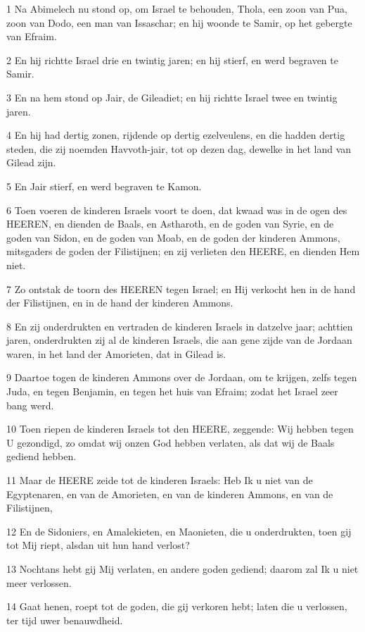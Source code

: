 \par 1 Na Abimelech nu stond op, om Israel te behouden, Thola, een zoon van Pua, zoon van Dodo, een man van Issaschar; en hij woonde te Samir, op het gebergte van Efraim.
\par 2 En hij richtte Israel drie en twintig jaren; en hij stierf, en werd begraven te Samir.
\par 3 En na hem stond op Jair, de Gileadiet; en hij richtte Israel twee en twintig jaren.
\par 4 En hij had dertig zonen, rijdende op dertig ezelveulens, en die hadden dertig steden, die zij noemden Havvoth-jair, tot op dezen dag, dewelke in het land van Gilead zijn.
\par 5 En Jair stierf, en werd begraven te Kamon.
\par 6 Toen voeren de kinderen Israels voort te doen, dat kwaad was in de ogen des HEEREN, en dienden de Baals, en Astharoth, en de goden van Syrie, en de goden van Sidon, en de goden van Moab, en de goden der kinderen Ammons, mitsgaders de goden der Filistijnen; en zij verlieten den HEERE, en dienden Hem niet.
\par 7 Zo ontstak de toorn des HEEREN tegen Israel; en Hij verkocht hen in de hand der Filistijnen, en in de hand der kinderen Ammons.
\par 8 En zij onderdrukten en vertraden de kinderen Israels in datzelve jaar; achttien jaren, onderdrukten zij al de kinderen Israels, die aan gene zijde van de Jordaan waren, in het land der Amorieten, dat in Gilead is.
\par 9 Daartoe togen de kinderen Ammons over de Jordaan, om te krijgen, zelfs tegen Juda, en tegen Benjamin, en tegen het huis van Efraim; zodat het Israel zeer bang werd.
\par 10 Toen riepen de kinderen Israels tot den HEERE, zeggende: Wij hebben tegen U gezondigd, zo omdat wij onzen God hebben verlaten, als dat wij de Baals gediend hebben.
\par 11 Maar de HEERE zeide tot de kinderen Israels: Heb Ik u niet van de Egyptenaren, en van de Amorieten, en van de kinderen Ammons, en van de Filistijnen,
\par 12 En de Sidoniers, en Amalekieten, en Maonieten, die u onderdrukten, toen gij tot Mij riept, alsdan uit hun hand verlost?
\par 13 Nochtans hebt gij Mij verlaten, en andere goden gediend; daarom zal Ik u niet meer verlossen.
\par 14 Gaat henen, roept tot de goden, die gij verkoren hebt; laten die u verlossen, ter tijd uwer benauwdheid.
